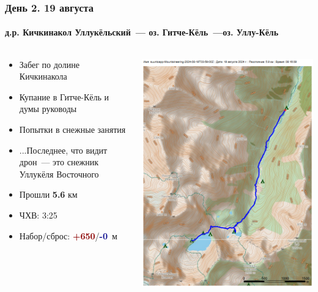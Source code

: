 	\begin{frame}
	\frametitle{День 2. 19 августа}
	\framesubtitle{д.р. Кичкинакол Уллукёльский~--- оз. Гитче-Кёль~---оз. Уллу-Кёль} %
	\begin{columns}[c] %
		\begin{column}{0.45\textwidth} %
			\begin{itemize}
				\item Забег по долине Кичкинакола
				\item Купание в Гитче-Кёль и думы руководы
				\item Попытки в снежные занятия
				\item ...Последнее, что видит дрон~--- это снежник Уллукёля Восточного \frownie
				\item Прошли \textbf{5.6} км
				\item ЧХВ: 3:25
				\item Набор/сброс: \textcolor{darkred}{\textbf{+650}}/\textcolor{darkblue}{\textbf{-0}}~м
			\end{itemize}
			
		\end{column}
		\begin{column}{0.5\textwidth} %
			\centering
			\includegraphics[width=\linewidth]{../pics/mini_maps/19}
		\end{column}
	\end{columns}
\end{frame}

